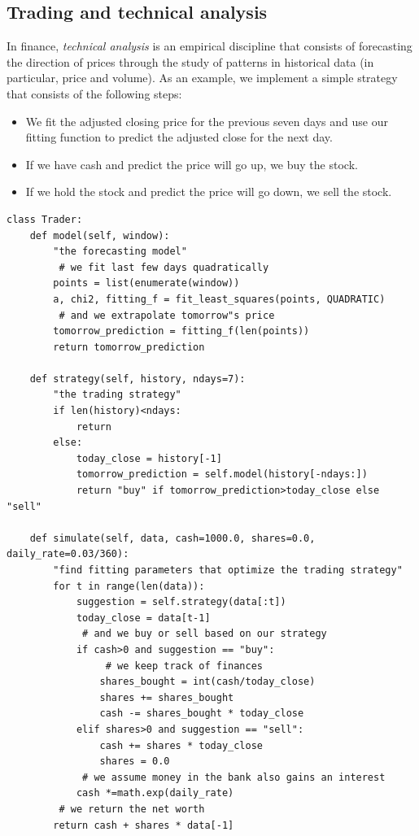 \documentclass[justified, sixbynine]{tufte-book}
\def\ft{\small\tt}
\theoremstyle{plain}%
\newtheorem * {corollary}{Corollary}
\theoremstyle{definition}
\theoremstyle{remark}
\newtheorem * {remark}{Remark}
\newtheorem * {note}{Note}
\begin{document}
\begin{fullwidth}
\goodbreak\subsection{Trading and technical analysis}


In finance, {\it technical analysis} is an empirical discipline that consists of forecasting the direction of prices through the study of patterns in historical data (in particular, price and volume). As an example, we implement a simple strategy that consists of the following steps:

\begin{itemize}
\item We fit the adjusted closing price for the previous seven days and use our fitting function to predict the adjusted close for the next day.
\item If we have cash and predict the price will go up, we buy the stock.
\item If we hold the stock and predict the price will go down, we sell the stock.
\end{itemize}


\begin{lstlisting}[caption={in file: {\ft nlib.py}}]
class Trader:
    def model(self, window):
        "the forecasting model"
         # we fit last few days quadratically
        points = list(enumerate(window))
        a, chi2, fitting_f = fit_least_squares(points, QUADRATIC)
         # and we extrapolate tomorrow"s price
        tomorrow_prediction = fitting_f(len(points))
        return tomorrow_prediction

    def strategy(self, history, ndays=7):
        "the trading strategy"
        if len(history)<ndays:
            return
        else:
            today_close = history[-1]
            tomorrow_prediction = self.model(history[-ndays:])
            return "buy" if tomorrow_prediction>today_close else "sell"

    def simulate(self, data, cash=1000.0, shares=0.0, daily_rate=0.03/360):
        "find fitting parameters that optimize the trading strategy"
        for t in range(len(data)):
            suggestion = self.strategy(data[:t])
            today_close = data[t-1]
             # and we buy or sell based on our strategy
            if cash>0 and suggestion == "buy":
                 # we keep track of finances
                shares_bought = int(cash/today_close)
                shares += shares_bought
                cash -= shares_bought * today_close
            elif shares>0 and suggestion == "sell":
                cash += shares * today_close
                shares = 0.0
             # we assume money in the bank also gains an interest
            cash *=math.exp(daily_rate)
         # we return the net worth
        return cash + shares * data[-1]
\end{lstlisting}


\end{fullwidth}
\end{document}
